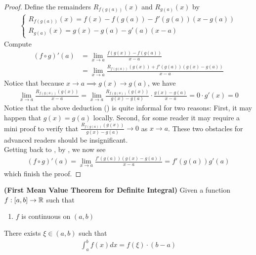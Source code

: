 \documentclass{report}
\begin{document}
\begin{proof}
Define the remainders $R_{f(g(a))}(x)$ and $R_{g(a)}(x)$ by 
\begin{align*}
\begin{cases}
R_{f(g(a))}(x)=f(x)-f(g(a))-f'(g(a))(x-g(a))\\
R_{g(a)}(x)=g(x)-g(a)-g'(a)(x-a)
\end{cases}
\end{align*}
Compute 
\begin{align}
\label{3.13}
  (f\circ g)'(a)&=\lim_{ x\to a}\frac{f(g(x))-f(g(a))}{x-a}\\
  &=\lim_{x\to a}\frac{R_{f(g(a))}(g(x))+f'(g(a))(g(x)-g(a))}{x-a}
\end{align}
Notice that because $x \to a \implies g(x)\to g(a)$, we have 
\begin{align}
\label{3.12}
\lim_{x\to a} \frac{R_{f(g(a))}(g(x))}{x-a}=\lim_{ x\to a} \frac{R_{f(g(a))}(g(x))}{g(x)-g(a)}\cdot \frac{g(x)-g(a)}{x-a}=0\cdot g'(x)=0
\end{align}
Notice that the above deduction () is quite informal for two reasons: First, it may happen that $g(x)=g(a)$ locally. Second, for some reader it may require a mini proof to verify that $\frac{R_{f(g(a))}(g(x))}{g(x)-g(a)}\to 0$ as $x\to a$. These two obstacles for advanced readers should be insignificant.\\

Getting back to , by , we now see 
\begin{align*}
  (f\circ g)'(a)=\lim_{x\to a}\frac{f'(g(a))(g(x)-g(a))}{x-a}=f'(g(a))g'(a)
\end{align*}
which finish the proof.
\end{proof}
\begin{theorem}
\textbf{(First Mean Value Theorem for Definite Integral)} Given a function $f:[a,b]\rightarrow \mathbb{R}$ such that 
\begin{enumerate}[label=(\alph*)]
  \item $f$ is continuous on $(a,b)$
\end{enumerate}
There exists $\xi \in (a,b)$ such that 
\begin{align*}
\int_a^b f(x)dx = f(\xi)\cdot (b-a)
\end{align*}
\end{theorem}
\end{document}
